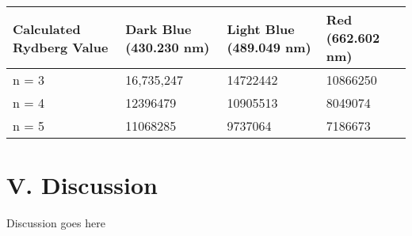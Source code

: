\documentclass{article}
\begin{document}
\begin{table}[H]
\begin{tabular}{|l|l|l|l|}
\hline
Calculated Rydberg Value & Dark Blue (430.230 nm) & Light Blue (489.049 nm) & Red (662.602 nm) \\ \hline
n = 3                    & 16,735,247             & 14722442                & 10866250         \\ \hline
n = 4                    & 12396479               & 10905513                & 8049074          \\ \hline
n = 5                    & 11068285               & 9737064                 & 7186673          \\ \hline
\end{tabular}
\end{table}

\section*{V. Discussion}
Discussion goes here
\end{document}
